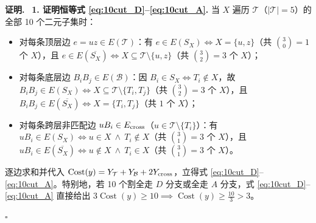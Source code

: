 \documentclass[11pt,a4paper]{ctexart}
\theoremstyle{definition}
\newenvironment{proofcn}{\par\noindent\textbf{证明.}\ }{\hfill$\square$\par}
\newcommand{\1}{\boldsymbol 1}
\newcommand{\0}{\boldsymbol 0}
\begin{document}
\begin{proofcn}
\textbf{1. 证明恒等式 \eqref{eq:10cut_D}--\eqref{eq:10cut_A}.}
当 $X$ 遍历 $\mathcal T$（$|\mathcal T|=5$）的全部 10 个二元子集时：
\begin{itemize}
\item 对每条顶层边 $e=uz\in E(\mathcal T)$：有 $e\in E(S_X)\iff X=\{u,z\}$（共 $\binom{3}{0}=1$ 个 $X$），且 $e\in E(\overline{S_X})\iff X\subseteq\mathcal T\setminus\{u,z\}$（共 $\binom{3}{2}=3$ 个 $X$）；
\item 对每条底层边 $B_iB_j\in E(\mathcal B)$：因 $B_i\in S_X\iff T_i\notin X$，故 $B_iB_j\in E(S_X)\iff X\subseteq\mathcal T\setminus\{T_i,T_j\}$（共 $\binom{3}{2}=3$ 个 $X$），且 $B_iB_j\in E(\overline{S_X})\iff X=\{T_i,T_j\}$（共 $1$ 个 $X$）；
\item 对每条跨层非匹配边 $uB_i\in E_{\rm cross}$（$u\in\mathcal T\setminus\{T_i\}$）：有 $uB_i\in E(S_X)\iff u\in X\ \land\ T_i\notin X$（共 $\binom{3}{1}=3$ 个 $X$），且 $uB_i\in E(\overline{S_X})\iff u\notin X\ \land\ T_i\in X$（共 $\binom{3}{1}=3$ 个 $X$）。
\end{itemize}
逐边求和并代入 $\operatorname{Cost}(y)=Y_{\mathcal T}+Y_{\mathcal B}+2Y_{\rm cross}$，立得式 \eqref{eq:10cut_D}--\eqref{eq:10cut_A}。特别地，若 10 个割全走 $D$ 分支或全走 $A$ 分支，式 \eqref{eq:10cut_D}--\eqref{eq:10cut_A} 直接给出 $3\operatorname{Cost}(y)\ge 10\implies\operatorname{Cost}(y)\ge\frac{10}{3}>3$。


\end{proofcn}
\end{document}
